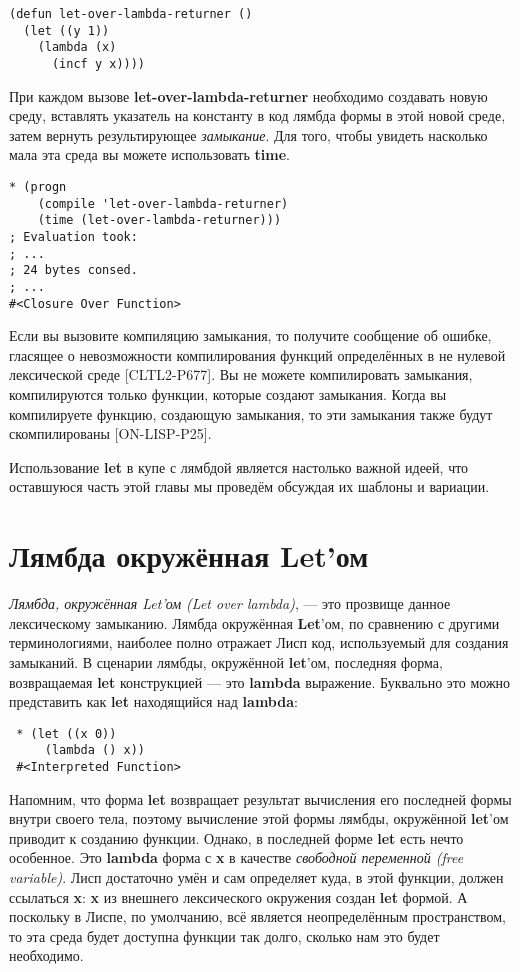 \begin{verbatim}
(defun let-over-lambda-returner ()
  (let ((y 1))
    (lambda (x)
      (incf y x))))
\end{verbatim}

При каждом вызове \textbf{let-over-lambda-returner} необходимо создавать новую среду, вставлять указатель на константу в код лямбда формы в этой новой среде, затем вернуть результирующее \emph{замыкание}. Для того, чтобы увидеть насколько мала эта среда вы можете использовать \textbf{time}.

\begin{verbatim}
* (progn
    (compile 'let-over-lambda-returner)
    (time (let-over-lambda-returner)))
; Evaluation took:
; ...
; 24 bytes consed.
; ...
#<Closure Over Function>
\end{verbatim}

Если вы вызовите компиляцию замыкания, то получите сообщение об ошибке, гласящее о невозможности компилирования функций определённых в не нулевой лексической среде [CLTL2-P677]. Вы не можете компилировать замыкания, компилируются только функции, которые создают замыкания. Когда вы компилируете функцию, создающую замыкания, то эти замыкания также будут скомпилированы [ON-LISP-P25].

Использование \textbf{let} в купе с лямбдой является настолько важной идеей, что оставшуюся часть этой главы мы проведём обсуждая их шаблоны и вариации.

\section{Лямбда окружённая Let'ом}\label{section_let_over_lambda}

\emph{Лямбда, окружённая Let'ом (Let over lambda)}, --- это прозвище данное лексическому замыканию. Лямбда окружённая \textbf{Let}'ом, по сравнению с другими терминологиями, наиболее полно отражает Лисп код, используемый для создания замыканий. В сценарии лямбды, окружённой \textbf{let}'ом, последняя форма, возвращаемая \textbf{let} конструкцией --- это \textbf{lambda} выражение. Буквально это можно представить как \textbf{let} находящийся над \textbf{lambda}:

\begin{verbatim}
 * (let ((x 0))
     (lambda () x))
 #<Interpreted Function>
\end{verbatim}

Напомним, что форма \textbf{let} возвращает результат вычисления его последней формы внутри своего тела, поэтому вычисление этой формы лямбды, окружённой \textbf{let}'ом приводит к созданию функции. Однако, в последней форме \textbf{let} есть нечто особенное. Это \textbf{lambda} форма с \textbf{x} в качестве \emph{свободной переменной (free variable)}. Лисп достаточно умён и сам определяет куда, в этой функции, должен ссылаться \textbf{x}: \textbf{x} из внешнего лексического окружения создан \textbf{let} формой. А поскольку в Лиспе, по умолчанию, всё является неопределённым пространством, то эта среда будет доступна функции так долго, сколько нам это будет необходимо.

